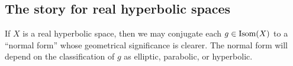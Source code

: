 %
%

\subsection{The story for real hyperbolic spaces}
If $X$ is a real hyperbolic space, then we may conjugate each $g\in\operatorname{Isom}(X)$ to a ``normal form'' whose geometrical significance is clearer. The normal form will depend on the classification of $g$ as elliptic, parabolic, or hyperbolic.



